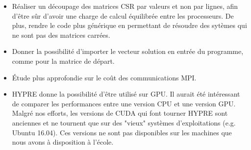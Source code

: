 \documentclass[10pt,twocolumn,letterpaper]{article}
\begin{document}
\begin{itemize}
  \item Réaliser un découpage des matrices CSR par valeurs et non
par lignes, afin d'être sûr d'avoir une charge de calcul équilibrée entre les
processeurs. De plus, rendre le code plus générique en permettant de résoudre
des sytèmes qui ne sont pas des matrices carrées.
  \item Donner la possibilité d'importer le vecteur solution en
entrée du programme, comme pour la matrice de départ.
  \item Étude plus approfondie sur le coût des communications MPI.
  \item HYPRE donne la possibilité d'être utilisé sur GPU. Il aurait été intéressant de
comparer les performances entre une version CPU et une version GPU. Malgré nos
efforts, les versions de CUDA qui font tourner HYPRE sont anciennes
et ne tournent que sur des "vieux" systèmes d'exploitations (e.g. Ubuntu 16.04).
Ces versions ne sont pas disponibles sur les machines que nous avons à
disposition à l'école.
\end{itemize}


\end{document}
